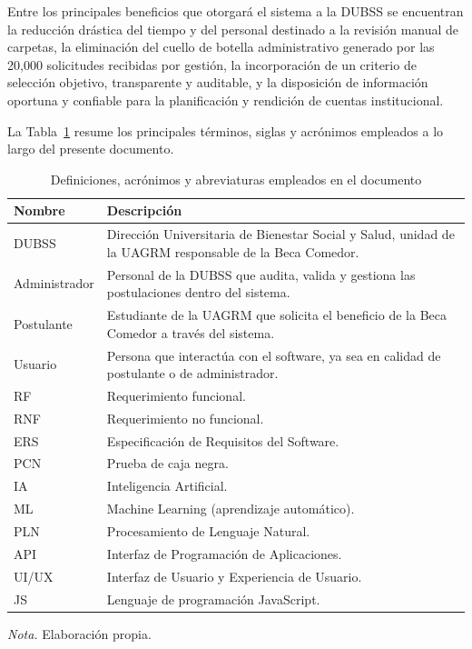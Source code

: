 Entre los principales beneficios que otorgará el sistema a la DUBSS se encuentran la reducción drástica del tiempo y del personal destinado a la revisión manual de carpetas, la eliminación del cuello de botella administrativo generado por las 20,000 solicitudes recibidas por gestión, la incorporación de un criterio de selección objetivo, transparente y auditable, y la disposición de información oportuna y confiable para la planificación y rendición de cuentas institucional.

\label{sec:ieee_definiciones}

La Tabla~\ref{tab:definiciones_abreviaturas} resume los principales términos, siglas y acrónimos empleados a lo largo del presente documento.

\begin{table}[H]
\caption{Definiciones, acrónimos y abreviaturas empleados en el documento}
\label{tab:definiciones_abreviaturas}
\begin{threeparttable}
\begin{tabular}{>{\raggedright\arraybackslash}p{3cm} >{\raggedright\arraybackslash}p{10cm}}
\toprule
Nombre & Descripción \\
\midrule
DUBSS & Dirección Universitaria de Bienestar Social y Salud, unidad de la UAGRM responsable de la Beca Comedor. \\
Administrador & Personal de la DUBSS que audita, valida y gestiona las postulaciones dentro del sistema. \\
Postulante & Estudiante de la UAGRM que solicita el beneficio de la Beca Comedor a través del sistema. \\
Usuario & Persona que interactúa con el software, ya sea en calidad de postulante o de administrador. \\
RF & Requerimiento funcional. \\
RNF & Requerimiento no funcional. \\
ERS & Especificación de Requisitos del Software. \\
PCN & Prueba de caja negra. \\
IA & Inteligencia Artificial. \\
ML & Machine Learning (aprendizaje automático). \\
PLN & Procesamiento de Lenguaje Natural. \\
API & Interfaz de Programación de Aplicaciones. \\
UI/UX & Interfaz de Usuario y Experiencia de Usuario. \\
JS & Lenguaje de programación JavaScript. \\
\bottomrule
\end{tabular}
\begin{tablenotes}
\item \textit{Nota.} Elaboración propia.
\end{tablenotes}
\end{threeparttable}
\end{table}

